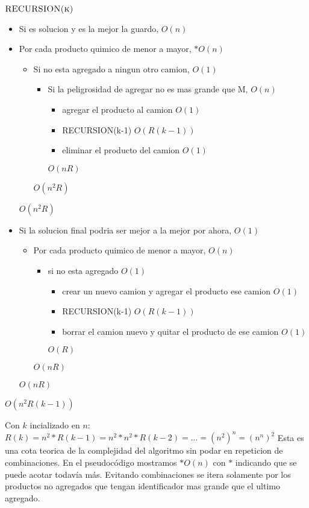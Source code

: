 $\textnormal{\scshape RECURSION(k)}$
\begin{itemize}
\item Si es solucion y es la mejor la guardo,						$O(n)$
\item Por cada producto quimico de menor a mayor, 						$*O(n)$
	\begin{itemize}
	\item Si no esta agregado a ningun otro camion,						$O(1)$			
		\begin{itemize}
		\item Si la peligrosidad de agregar no es mas grande que M,		$O(n)$
			\begin{itemize}
			\item agregar el producto al camion							$O(1)$
			\item RECURSION(k-1)											$O(R(k-1))$
			\item eliminar el producto del camion							$O(1)$
			\end{itemize}													$O(nR)$
		\end{itemize}													$O(n^2R)$
	\end{itemize}															$O(n^2R)$
\item Si la solucion final podria ser mejor a la mejor por ahora,				$O(1)$
	\begin{itemize}
	\item Por cada producto quimico de menor a mayor,								$O(n)$
		\begin{itemize}
		\item si no esta agregado													$O(1)$
			\begin{itemize}
			\item crear un nuevo camion y agregar el producto ese camion			$O(1)$
			\item RECURSION(k-1)													$O(R(k-1))$
			\item borrar el camion nuevo y quitar el producto de ese camion		$O(1)$
			\end{itemize}						$O(R)$
		\end{itemize}						$O(nR)$
	\end{itemize}						$O(nR)$
\end{itemize}	$O(n^2R(k-1))$


Con $k$ incializado en $n$:
$R(k) = n^2*R(k-1) = n^2*n^2*R(k-2) = ... = (n^2)^n = (n^n)^2$
Esta es una cota teorica de la complejidad del algoritmo sin podar en repeticion de combinaciones. 
En el pseudoc\'odigo mostramos $*O(n)$ con $*$ indicando que se puede acotar todav\'ia m\'as. Evitando combinaciones se itera solamente por los productos no agregados que tengan identificador mas grande que el ultimo agregado.



